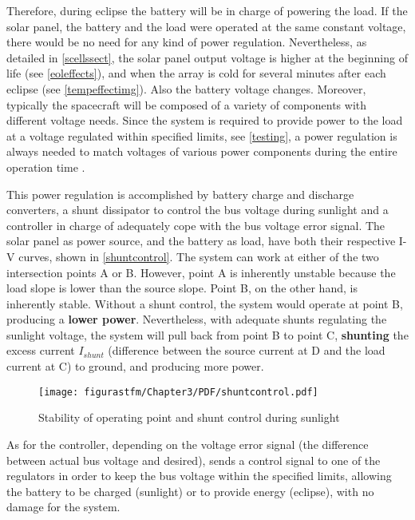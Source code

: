 Therefore, during eclipse the battery will be in charge of powering the load. If the solar panel, the battery and the load were operated at the same constant voltage, there would be no need for any kind of power regulation. Nevertheless, as detailed in \ref{scellssect}, the solar panel output voltage is higher at the beginning of life (see \autoref{eoleffects}), and when the array is cold for several minutes after each eclipse (see \autoref{tempeffectimg}). Also the battery voltage changes. Moreover, typically the spacecraft will be composed of a variety of components with different voltage needs. Since the system is required to provide power to the load at a voltage regulated within specified limits, see \ref{testing}, a power regulation is always needed to match voltages of various power components during the entire operation time \cite{spacecraftspower}.

This power regulation is accomplished by battery charge and discharge converters, a shunt dissipator to control the bus voltage during sunlight and a controller in charge of adequately cope with the bus voltage error signal. The solar panel as power source, and the battery as load, have both their respective I-V curves, shown in \autoref{shuntcontrol}. The system can work at either of the two intersection points A or B. However, point A is inherently unstable because the load slope is lower than the source slope. Point B, on the other hand, is inherently stable. Without a shunt control, the system would operate at point B, producing a \textbf{lower power}. Nevertheless, with adequate shunts regulating the sunlight voltage, the system will pull back from point B to point C, \textbf{shunting} the excess current $I_{shunt}$ (difference between the source current at D and the load current at C) to ground, and producing more power.



\begin{figure} [H] 				
				\centering
				\texttt{[image: figurastfm/Chapter3/PDF/shuntcontrol.pdf]}
				\caption{Stability of operating point and shunt control during sunlight \cite{spacecraftspower}} \label{shuntcontrol}
			\end{figure}


As for the controller, depending on the voltage error signal (the difference between actual bus voltage and desired), sends a control signal to one of the regulators in order to keep the bus voltage within the specified limits, allowing the battery to be charged (sunlight) or to provide energy (eclipse), with no damage for the system.

